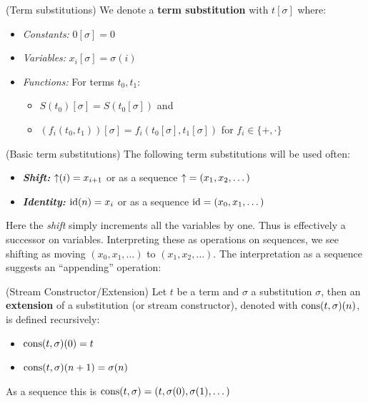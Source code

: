 \begin{cthdefinition}{(Term substitutions)}
We denote a \textbf{term substitution} with \(t [ \sigma ]\) where:
\begin{itemize}[noitemsep,topsep=0pt]
\item \emph{Constants:} \(0 [ \sigma ] = 0\)
\item \emph{Variables:} \(x_i [ \sigma ] = \sigma(i)\)
\item \emph{Functions:} For terms $t_0, t_1$: \begin{itemize}[noitemsep,topsep=0pt]
    \item $S(t_0)[\sigma] = S(t_0[\sigma])$ and
    \item \((f_i(t_0, t_1)) [\sigma] = f_i(t_0[\sigma], t_1[\sigma])\)
      for $f_i \in \{ +, \cdot \}$
  \end{itemize}
\end{itemize}
\end{cthdefinition}

\begin{cthdefinition}{(Basic term substitutions)}
The following term substitutions will be used often:
\begin{itemize}[noitemsep,topsep=0pt]
  \item \textbf{\emph{Shift:}} \(\operatorname{\uparrow}(i) = x_{i + 1}\) or as a sequence $\operatorname{\uparrow} = (x_1, x_2, \dots)$
  \item \textbf{\emph{Identity:}} \(\operatorname{id}(n) = x_i\) or as a sequence $\operatorname{id} = (x_0, x_1, \dots)$
\end{itemize}
\end{cthdefinition}

Here the \emph{shift} simply increments all the variables by one. Thus is effectively a successor on variables. Interpreting these as operations on sequences, we see shifting as moving $(x_0, x_1, \dots)$ to $(x_1, x_2, \dots)$. The interpretation as a sequence suggests an ``appending'' operation:

\begin{cthdefinition}{(Stream Constructor/Extension)}
  Let $t$ be a term and $\sigma$ a substitution \(\sigma\), then an \textbf{extension} of a substitution (or stream constructor), denoted with \(\operatorname{cons}(t,\sigma)(n)\), is defined recursively:
  \begin{itemize}[noitemsep,topsep=0pt]
  \item \(\operatorname{cons}(t,\sigma)(0) = t\)
  \item \(\operatorname{cons}(t,\sigma)(n + 1) = \sigma(n)\)
  \end{itemize}
  As a sequence this is \(\operatorname{cons}(t,\sigma) = (t, \sigma(0), \sigma(1), \dots)\)
\end{cthdefinition}

